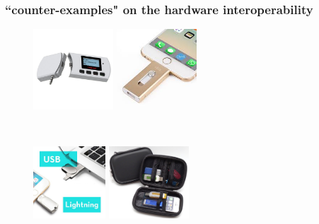 \documentclass[aspectratio=169,xcolor=dvipsnames]{beamer}
\begin{document}
\frame
{
\frametitle{``counter-examples" on the hardware interoperability}

\begin{figure}
\centering
\begin{minipage}[b]{0.3\textwidth}
\centering
\includegraphics[width=3cm]{./pics/mickey.jpg}
\end{minipage}%
\hspace{0.04\textwidth}%
\begin{minipage}[b]{0.3\textwidth}
\centering
\includegraphics[width=3cm]{./pics/iphonekey.jpeg}
\end{minipage}\\[20pt]
\begin{minipage}[b]{0.3\textwidth}
\centering
\includegraphics[width=2.7cm]{./pics/usb-lightning.jpg}
\end{minipage}
\begin{minipage}[b]{0.3\textwidth}
\centering
\includegraphics[width=3cm]{./pics/keyproblem.png}
\end{minipage}
\end{figure}
}
\end{document}
